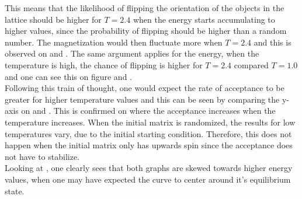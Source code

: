 \documentclass[10pt,a4paper]{article}
\begin{document}
\noindent This means that the likelihood of flipping the orientation of the objects in the lattice should be higher for $T = 2.4$ when the energy starts accumulating to higher values, since the probability of flipping should be higher than a random number. The magnetization would then fluctuate more when $T = 2.4$ and this is observed on  and . The same argument applies for the energy, when the temperature is high, the chance of flipping is higher for $T = 2.4$ compared $T = 1.0$ and one can see this on figure  and .
\\
Following this train of thought, one would expect the rate of acceptance to be greater for higher temperature values and this can be seen by comparing the y-axis on  and . This is confirmed on  where the acceptance increases when the temperature increases. When the initial matrix is randomized, the results for low temperatures vary, due to the initial starting condition. Therefore, this does not happen when the initial matrix only has upwards spin since the acceptance does not have to stabilize.
\\
Looking at , one clearly sees that both graphs are skewed towards higher energy values, when one may have expected the curve to center around it's equilibrium state. 
\end{document}
